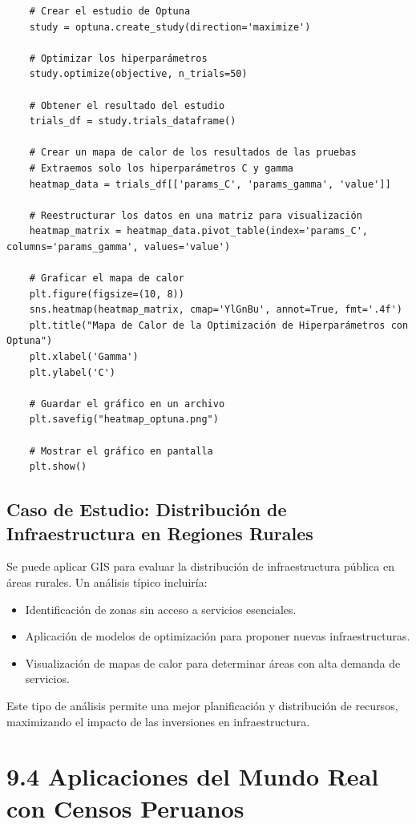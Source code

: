 \documentclass{article}
\begin{document}
{\begin{lstlisting}
	# Crear el estudio de Optuna
	study = optuna.create_study(direction='maximize')
	
	# Optimizar los hiperparámetros
	study.optimize(objective, n_trials=50)
	
	# Obtener el resultado del estudio
	trials_df = study.trials_dataframe()
	
	# Crear un mapa de calor de los resultados de las pruebas
	# Extraemos solo los hiperparámetros C y gamma
	heatmap_data = trials_df[['params_C', 'params_gamma', 'value']]
	
	# Reestructurar los datos en una matriz para visualización
	heatmap_matrix = heatmap_data.pivot_table(index='params_C', columns='params_gamma', values='value')
	
	# Graficar el mapa de calor
	plt.figure(figsize=(10, 8))
	sns.heatmap(heatmap_matrix, cmap='YlGnBu', annot=True, fmt='.4f')
	plt.title("Mapa de Calor de la Optimización de Hiperparámetros con Optuna")
	plt.xlabel('Gamma')
	plt.ylabel('C')
	
	# Guardar el gráfico en un archivo
	plt.savefig("heatmap_optuna.png")
	
	# Mostrar el gráfico en pantalla
	plt.show()
\end{lstlisting}


\subsection*{Caso de Estudio: Distribución de Infraestructura en Regiones Rurales}
Se puede aplicar GIS para evaluar la distribución de infraestructura pública en áreas rurales. Un análisis típico incluiría:

\begin{itemize}
	\item Identificación de zonas sin acceso a servicios esenciales.
	\item Aplicación de modelos de optimización para proponer nuevas infraestructuras.
	\item Visualización de mapas de calor para determinar áreas con alta demanda de servicios.
\end{itemize}

Este tipo de análisis permite una mejor planificación y distribución de recursos, maximizando el impacto de las inversiones en infraestructura.


\section*{9.4 Aplicaciones del Mundo Real con Censos Peruanos}

}
\end{document}
